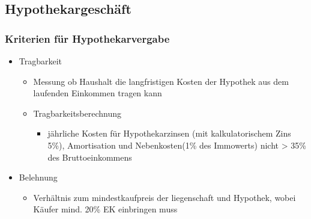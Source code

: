 \subsection{Hypothekargeschäft}

\subsubsection{Kriterien für Hypothekarvergabe}

\begin{itemize}
    \item Tragbarkeit
    \begin{itemize}
        \item Messung ob Haushalt die langfristigen Kosten der
        Hypothek aus dem laufenden Einkommen tragen kann
        \item Tragbarkeitsberechnung
        \begin{itemize}
            \item jährliche Kosten für Hypothekarzinsen (mit
            kalkulatorischem Zins 5\%), Amortisation und
            Nebenkosten(1\% des Immowerts) nicht > 35\% des Bruttoeinkommens
        \end{itemize}
    \end{itemize}
    \item Belehnung
    \begin{itemize}
        \item Verhältnis zum mindestkaufpreis der liegenschaft
        und Hypothek, wobei Käufer mind. 20\% EK einbringen muss
    \end{itemize}
\end{itemize}




